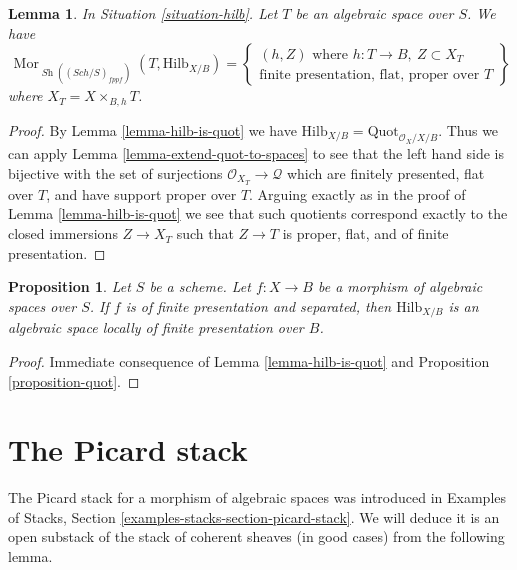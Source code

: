 \documentclass{stacks-project}
\theoremstyle{plain}
\newtheorem{proposition}[subsection]{Proposition}
\newtheorem{lemma}[subsection]{Lemma}
\theoremstyle{definition}
\theoremstyle{remark}
\numberwithin{equation}{subsection}
\def\Sch{\mathit{Sch}}
\def\Mor{\mathop{\mathrm{Mor}}\nolimits}
\def\Sh{\mathop{\mathit{Sh}}\nolimits}
\def\Quotfunctor{\mathrm{Quot}}
\def\Hilbfunctor{\mathrm{Hilb}}
\begin{document}
\begin{lemma}
\label{lemma-extend-hilb-to-spaces}
In Situation \ref{situation-hilb}. Let $T$ be an algebraic space over $S$.
We have
$$
\Mor_{\Sh((\Sch/S)_{fppf})}(T, \Hilbfunctor_{X/B}) =
\left\{
\begin{matrix}
(h, Z)\text{ where }h : T \to B,\ Z \subset X_T \\
\text{finite presentation, flat, proper over }T
\end{matrix}
\right\}
$$
where $X_T = X \times_{B, h} T$.
\end{lemma}

\begin{proof}
By Lemma \ref{lemma-hilb-is-quot}
we have $\Hilbfunctor_{X/B} = \Quotfunctor_{\mathcal{O}_X/X/B}$.
Thus we can apply Lemma \ref{lemma-extend-quot-to-spaces}
to see that the left hand side is bijective with the set
of surjections $\mathcal{O}_{X_T} \to \mathcal{Q}$
which are finitely presented, flat over $T$, and
have support proper over $T$. Arguing exactly as in the
proof of Lemma \ref{lemma-hilb-is-quot}
we see that such quotients correspond
exactly to the closed immersions $Z \to X_T$ such that
$Z \to T$ is proper, flat, and of finite presentation.
\end{proof}

\begin{proposition}
\label{proposition-hilb}
Let $S$ be a scheme. Let $f : X \to B$ be a morphism of algebraic
spaces over $S$. If $f$ is of finite presentation and separated, then
$\Hilbfunctor_{X/B}$ is an algebraic space locally of finite
presentation over $B$.
\end{proposition}

\begin{proof}
Immediate consequence of
Lemma \ref{lemma-hilb-is-quot}
and Proposition \ref{proposition-quot}.
\end{proof}






\section{The Picard stack}
\label{section-picard-stack}

\noindent
The Picard stack for a morphism of algebraic spaces was introduced
in Examples of Stacks, Section \ref{examples-stacks-section-picard-stack}.
We will deduce it is an open substack of the stack of coherent sheaves
(in good cases) from the following lemma.
\end{document}
